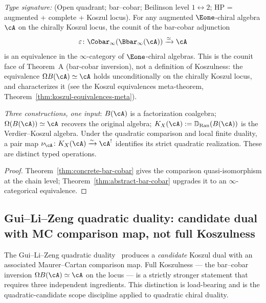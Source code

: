 \begin{corollary}
\label{cor:derived-koszul}
\emph{Type signature:} (Open quadrant; bar--cobar; Beilinson level
$1\!\leftrightarrow\!2$; HP = augmented + complete + Koszul locus).
For any augmented $\Eone$-chiral algebra $\cA$ on the chirally Koszul
locus, the counit of the bar-cobar adjunction
\[
\varepsilon\colon \Cobar_\infty(\Bbar_\infty(\cA)) \xrightarrow{\simeq} \cA
\]
is an equivalence in the $\infty$-category of $\Eone$-chiral algebras. This
is the counit face of Theorem~A (bar-cobar inversion), not a definition of
Koszulness: the
equivalence $\Omega B(\cA) \simeq \cA$ holds unconditionally on the chirally
Koszul locus, and characterizes it (see the Koszul equivalences meta-theorem,
Theorem~\ref{thm:koszul-equivalences-meta}).

\noindent\emph{Three constructions, one input}: $B(\cA)$ is a
factorization coalgebra; $\Omega(B(\cA)) \simeq \cA$ recovers the
original algebra; $K_X(\cA):=\mathbb{D}_{\mathrm{Ran}}(B(\cA))$ is the
Verdier--Koszul algebra.  Under the quadratic comparison and local
finite duality, a pair map
\(\nu_\cA\colon K_X(\cA)\xrightarrow{\sim}\cA^!\) identifies its
strict quadratic realization.  These are distinct typed operations.
\begin{proof}
Theorem~\ref{thm:concrete-bar-cobar} gives the comparison quasi-isomorphism at
the chain level; Theorem~\ref{thm:abstract-bar-cobar} upgrades it to an
$\infty$-categorical equivalence.
\end{proof}
\end{corollary}

\subsection{Gui--Li--Zeng quadratic duality: candidate dual with MC
comparison map, not full Koszulness}
\label{subsec:glz-scope-vs-full-koszulness}

The Gui--Li--Zeng quadratic duality~\cite{GLZ22} produces a
\emph{candidate} Koszul dual with an associated Maurer--Cartan
comparison map. Full Koszulness — the bar--cobar inversion
$\Omega B(\cA) \simeq \cA$ on the locus — is a strictly stronger
statement that requires three independent ingredients. This
distinction is load-bearing and is the quadratic-candidate scope discipline applied
to quadratic chiral duality.

